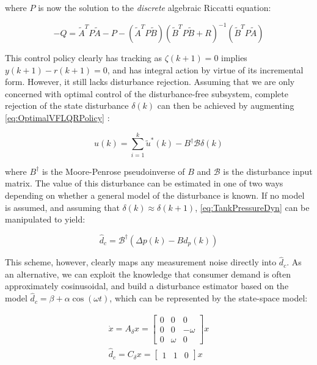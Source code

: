 where $P$ is now the solution to the \textit{discrete} algebraic Riccatti equation:

\begin{equation}\label{eq:DARE}
	-Q = \tilde{A}^TP\tilde{A} - P - (\tilde{A}^TP\tilde{B})(\tilde{B}^TP\tilde{B}+R)^{-1}(\tilde{B}^TP\tilde{A})
\end{equation}

This control policy clearly has tracking as $\zeta(k+1) = 0$ implies $y(k+1)-r(k+1) = 0$, and has integral action by virtue of its incremental form. However, it still lacks disturbance rejection. Assuming that we are only concerned with optimal control of the disturbance-free subsystem, complete rejection of the state disturbance $\delta(k)$ can then be achieved by augmenting \cref{eq:OptimalVFLQRPolicy} \cite{Singh2017}:

\begin{equation}
	u(k) = \sum_{i=1}^{k} \tilde{u}^*(k) - B^\dagger \mathcal{B}\delta(k)
\end{equation}

where $B^\dagger$ is the Moore-Penrose pseudoinverse of $B$ and $\mathcal{B}$ is the disturbance input matrix. The value of this disturbance can be estimated in one of two ways depending on whether a general model of the disturbance is known. If no model is assumed, and assuming that $\delta(k) \approx \delta(k+1)$, \cref{eq:TankPressureDyn} can be manipulated to yield:

\begin{equation}\label{eq:AgnosticDisturbanceEstimation}
	\hat{d}_c = \mathcal{B}^\dagger (\Delta p(k) - Bd_p(k))
\end{equation}

This scheme, however, clearly maps any measurement noise directly into $\hat{d}_c$. As an alternative, we can exploit the knowledge that consumer demand is often approximately cosinusoidal, and build a disturbance estimator based on the model $\hat{d}_c = \beta + \alpha\cos(\omega t)$, which can be represented by the state-space model:

\begin{equation}\label{eq:TheisticDisturbanceEstimator}
	\begin{gathered}
		\dot{x} = A_\delta x =  \begin{bmatrix}0 & 0 & 0 \\ 0 & 0 & -\omega \\ 0 & \omega & 0	\end{bmatrix}x \\
		\hat{d}_c = C_\delta x = \begin{bmatrix} 1 & 1 & 0 \end{bmatrix} x
	\end{gathered}
\end{equation}

